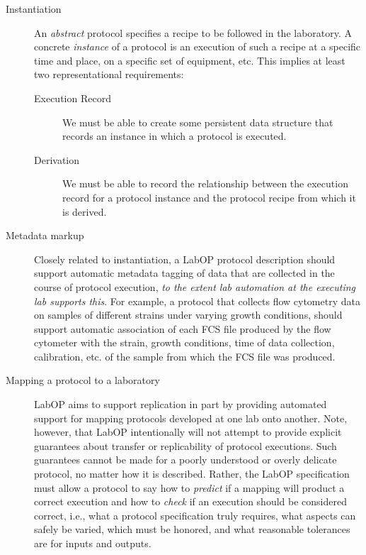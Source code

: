\begin{description}
\item[Instantiation] An \emph{abstract} protocol specifies a recipe to be followed in the laboratory.  A concrete \emph{instance} of a protocol is an execution of such a recipe at a specific time and place, on a specific set of equipment, etc.  This implies at least two representational requirements:
  \begin{description}
  \item[Execution Record] We must be able to create some persistent data structure that records an instance in which a protocol is executed.
  \item[Derivation] We must be able to record the relationship between the execution record for a protocol instance and the protocol recipe from which it is derived.
  \end{description}

\item[Metadata markup] Closely related to instantiation, a LabOP protocol description should support automatic metadata tagging of data that are collected in the course of protocol execution, \emph{to the extent lab automation at the executing lab supports this}.  
For example, a protocol that collects flow cytometry data on samples of different strains under varying growth conditions, should support automatic association of each FCS file produced by the flow cytometer with the strain, growth conditions, time of data collection, calibration, etc. of the sample from which the FCS file was produced.

\item[Mapping a protocol to a laboratory] LabOP aims to support replication in part by providing automated support for mapping protocols developed at one lab onto another.  
Note, however, that LabOP intentionally will not attempt to provide explicit guarantees about transfer or replicability of protocol executions. 
Such guarantees cannot be made for a poorly understood or overly delicate protocol, no matter how it is described.
Rather, the LabOP specification must allow a protocol to say how to {\em predict} if a mapping will product a correct execution and how to {\em check} if an execution should be considered correct, i.e., what a protocol specification truly requires, what aspects can safely be varied, which must be honored, and what reasonable tolerances are for inputs and outputs. 


\end{description}
